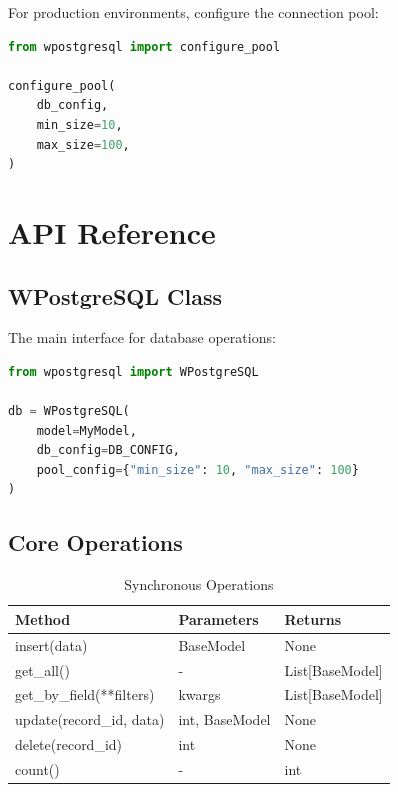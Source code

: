 \documentclass[12pt,a4paper]{report}
\begin{document}
For production environments, configure the connection pool:

\begin{lstlisting}[language=Python, caption=Pool Configuration]
from wpostgresql import configure_pool

configure_pool(
    db_config,
    min_size=10,
    max_size=100,
)
\end{lstlisting}

\chapter{API Reference}

\section{WPostgreSQL Class}

The main interface for database operations:

\begin{lstlisting}[language=Python, caption=WPostgreSQL Initialization]
from wpostgresql import WPostgreSQL

db = WPostgreSQL(
    model=MyModel,
    db_config=DB_CONFIG,
    pool_config={"min_size": 10, "max_size": 100}
)
\end{lstlisting}

\section{Core Operations}

\begin{table}[H]
	\centering
	\caption{Synchronous Operations}
	\begin{tabular}{@{}lll@{}}
		\toprule
		\textbf{Method}           & \textbf{Parameters} & \textbf{Returns} \\
		\midrule
		insert(data)              & BaseModel           & None             \\
		get\_all()                & -                   & List[BaseModel]  \\
		get\_by\_field(**filters) & kwargs              & List[BaseModel]  \\
		update(record\_id, data)  & int, BaseModel      & None             \\
		delete(record\_id)        & int                 & None             \\
		count()                   & -                   & int              \\
		\bottomrule
	\end{tabular}
\end{table}
\end{document}
